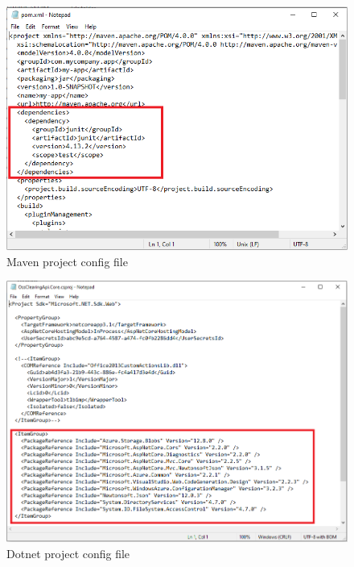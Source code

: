\begin{figure}[H]
	\includegraphics[width=15cm]{includes/pom.PNG}
	\centering
	\caption{Maven project config file}
	\label{fig:pom}
\end{figure}
\begin{figure}[H]
	\includegraphics[width=15cm]{includes/dotnet.PNG}
	\centering
	\caption{Dotnet project config file}
	\label{fig:dotnet}
\end{figure}

